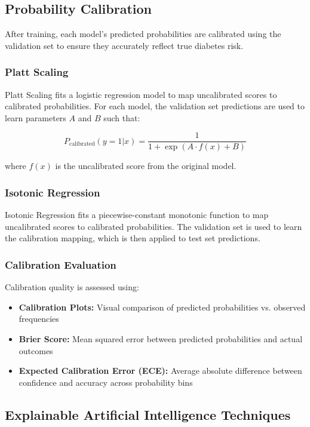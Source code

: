 \subsection{Probability Calibration}

After training, each model's predicted probabilities are calibrated using the validation set to ensure they accurately reflect true diabetes risk.

\subsubsection{Platt Scaling}

Platt Scaling fits a logistic regression model to map uncalibrated scores to calibrated probabilities. For each model, the validation set predictions are used to learn parameters $A$ and $B$ such that:

$$P_{\mathrm{calibrated}}(y=1|x) = \frac{1}{1 + \exp(A \cdot f(x) + B)}$$

where $f(x)$ is the uncalibrated score from the original model.

\subsubsection{Isotonic Regression}

Isotonic Regression fits a piecewise-constant monotonic function to map uncalibrated scores to calibrated probabilities. The validation set is used to learn the calibration mapping, which is then applied to test set predictions.

\subsubsection{Calibration Evaluation}

Calibration quality is assessed using:

\begin{itemize}
    \item \textbf{Calibration Plots:} Visual comparison of predicted probabilities vs. observed frequencies
    \item \textbf{Brier Score:} Mean squared error between predicted probabilities and actual outcomes
    \item \textbf{Expected Calibration Error (ECE):} Average absolute difference between confidence and accuracy across probability bins
\end{itemize}

\subsection{Explainable Artificial Intelligence Techniques}

